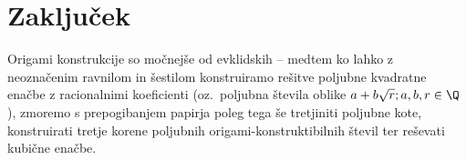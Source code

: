 \section{Zaključek}

Origami konstrukcije so močnejše od evklidskih -- medtem ko lahko z neoznačenim ravnilom in šestilom konstruiramo rešitve poljubne kvadratne enačbe z racionalnimi koeficienti (oz.\ poljubna števila oblike $a + b\sqrt{r}; a,b,r \in \Q$), zmoremo s prepogibanjem papirja poleg tega še tretjiniti poljubne kote, konstruirati tretje korene poljubnih origami-konstruktibilnih števil ter reševati kubične enačbe.